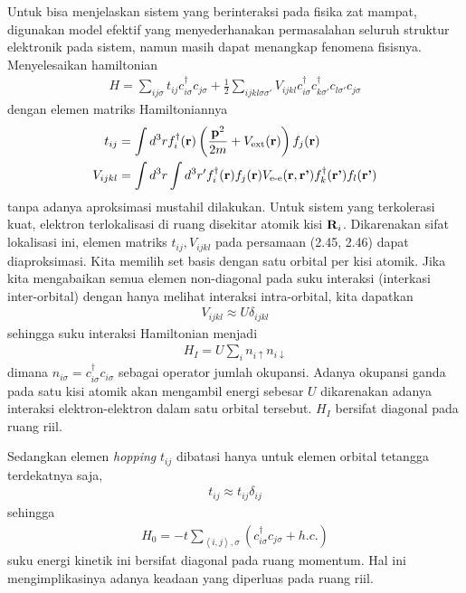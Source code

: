 Untuk bisa menjelaskan sistem yang berinteraksi pada fisika zat mampat, digunakan model efektif yang menyederhanakan permasalahan seluruh struktur elektronik pada sistem, namun masih dapat menangkap fenomena fisisnya. Menyelesaikan hamiltonian 
\begin{align}
H = \sum_{ij\sigma} t_{ij} c^\dagger_{i\sigma} c_{j\sigma} + \frac{1}{2} \sum_{ijkl\sigma\sigma'} V_{ijkl} c^\dagger_{i\sigma} c^\dagger_{k\sigma'} c_{l\sigma'} c_{j\sigma}
\end{align}
dengan elemen matriks Hamiltoniannya
\begin{align}
t_{ij} &= \int d^3r f^\dagger_i(\textbf{r}) \left( \frac{\textbf{p}^2}{2m} + V_\text{ext}(\textbf{r}) \right) f_j(\textbf{r})\\
V_{ijkl} &= \int d^3r \int d^3r' f^\dagger_i(\textbf{r}) f_j(\textbf{r}) V_{\text{e-e}}(\textbf{r},\textbf{r'}) f^\dagger_k(\textbf{r'})f_l(\textbf{r'})
\end{align}
tanpa adanya aproksimasi mustahil dilakukan. Untuk sistem yang terkolerasi kuat, elektron terlokalisasi di ruang disekitar atomik kisi $\textbf{R}_i$. Dikarenakan sifat lokalisasi ini, elemen matriks $t_{ij}, V_{ijkl}$ pada persamaan (2.45, 2.46) dapat diaproksimasi. Kita memilih set basis dengan satu orbital per kisi atomik. Jika kita mengabaikan semua elemen non-diagonal pada suku interaksi (interkasi inter-orbital) dengan hanya melihat interaksi intra-orbital, kita dapatkan
\begin{align}
V_{ijkl} \approx U\delta_{ijkl}
\end{align} 
sehingga suku interaksi Hamiltonian menjadi
\begin{align}
H_I = U\sum_i n_{i\uparrow} n_{i\downarrow}
\end{align}
dimana $n_{i\sigma} = c^\dagger_{i\sigma} c_{i\sigma}$ sebagai operator jumlah okupansi. Adanya okupansi ganda pada satu kisi atomik akan mengambil energi sebesar $U$ dikarenakan adanya interaksi elektron-elektron dalam satu orbital tersebut. $H_I$ bersifat diagonal pada ruang riil. 

Sedangkan elemen \textit{hopping} $t_{ij}$ dibatasi hanya untuk elemen orbital tetangga terdekatnya saja,
\begin{align}
t_{ij} \approx t_{ij}\delta_{ij}
\end{align}
sehingga
\begin{align}
H_0 = - t \sum_{\left\langle i,j \right\rangle, \sigma} \left( c^\dagger_{i\sigma} c_{j\sigma} + h.c. \right)
\end{align}
suku energi kinetik ini bersifat diagonal pada ruang momentum. Hal ini mengimplikasinya adanya keadaan yang diperluas pada ruang riil.

